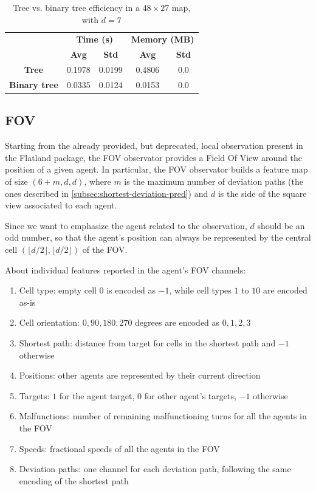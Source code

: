 \documentclass[a4paper,10pt]{report}
\begin{document}
\begin{table}[h]
	\center
	\begin{tabular}{||c c c c c||}
		\hline
					& \multicolumn{2}{c}{\textbf{Time (s)}} & \multicolumn{2}{c||}{\textbf{Memory (MB)}} \\  [0.5ex]
					& \textbf{Avg}         & \textbf{Std}        & \textbf{Avg}          & \textbf{Std} \\  [0.5ex]
		\hline\hline
		\textbf{Tree} & 0.1978 & 0.0199 & 0.4806 & 0.0 \\
		\hline
		\textbf{Binary tree} & 0.0335 & 0.0124 & 0.0153 & 0.0 \\
		\hline       
	\end{tabular}
	\caption{Tree vs. binary tree efficiency in a $48\times 27$ map, with $d=7$}
	\label{table:tree-bt-48x27}
\end{table}

\subsection{FOV}\label{subsec:fov-obs}
Starting from the already provided, but deprecated, local observation present in the Flatland package, the FOV observator provides a Field Of View around the position of a given agent. In particular, the FOV observator builds a feature map of size $(6 + m, d, d)$, where $m$ is the maximum number of deviation paths (the ones described in \ref{subsec:shortest-deviation-pred}) and $d$ is the side of the square view associated to each agent.

Since we want to emphasize the agent related to the observation, $d$ should be an odd number, so that the agent's position can always be represented by the central cell $(\lfloor d / 2 \rfloor, \lfloor d / 2 \rfloor)$ of the FOV.

About individual features reported in the agent's FOV channels:
\begin{enumerate}
	\item Cell type: empty cell $0$ is encoded as $-1$, while cell types $1$ to $10$ are encoded as-is
	\item Cell orientation: $0, 90, 180, 270$ degrees are encoded as $0, 1, 2, 3$
	\item Shortest path: distance from target for cells in the shortest path and $-1$ otherwise
	\item Positions: other agents are represented by their current direction
	\item Targets: $1$ for the agent target, $0$ for other agent's targets, $-1$ otherwise
	\item Malfunctions: number of remaining malfunctioning turns for all the agents in the FOV
	\item Speeds: fractional speeds of all the agents in the FOV
	\item Deviation paths: one channel for each deviation path, following the same encoding of the shortest path
\end{enumerate}
\end{document}
